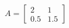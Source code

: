 \documentclass[preview]{standalone}
\begin{document}
\begin{align*}
A = \begin{bmatrix} 2 & 1 \\ 0.5 & 1.5 \end{bmatrix}
\end{align*}
\end{document}
